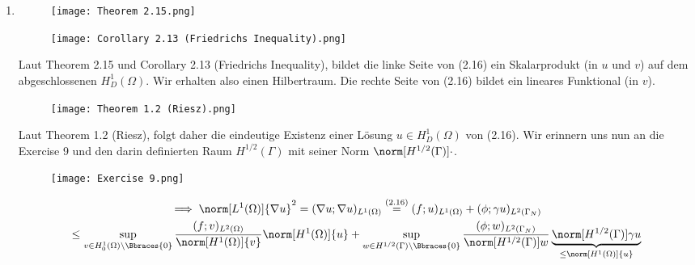 \begin{solution}
\begin{enumerate}[label = (\roman*)]
    \item

    \begin{figure}[h!]
        \centering
        \texttt{[image: Theorem 2.15.png]}
    \end{figure}

    \begin{figure}[h!]
        \centering
        \texttt{[image: Corollary 2.13 (Friedrichs Inequality).png]}
    \end{figure}

    Laut Theorem 2.15 und Corollary 2.13 (Friedrichs Inequality), bildet die linke Seite von (2.16) ein Skalarprodukt (in $u$ und $v$) auf dem abgeschlossenen $H_D^1(\Omega)$.
    Wir erhalten also einen Hilbertraum.
    Die rechte Seite von (2.16) bildet ein lineares Funktional (in $v$).
    
    \begin{figure}[h!]
        \centering
        \texttt{[image: Theorem 1.2 (Riesz).png]}
    \end{figure}

    Laut Theorem 1.2 (Riesz), folgt daher die eindeutige Existenz einer Lösung $u \in H_D^1(\Omega)$ von (2.16).
    Wir erinnern uns nun an die Exercise 9 und den darin definierten Raum $H^{1/2}(\Gamma)$ mit seiner Norm $\norm[H^{1/2}(\Gamma)]{\cdot}$.

    \begin{figure}[h!]
        \centering
        \texttt{[image: Exercise 9.png]}
    \end{figure}

    \begin{multline*}
        \implies
        \norm[L^1(\Omega)]{\nabla u}^2
        =
        (\nabla u; \nabla u)_{L^1(\Omega)}
        \stackrel{\text{(2.16)}}{=}
        (f; u)_{L^1(\Omega)}
        +
        (\phi; \gamma u)_{L^2(\Gamma_N)} \\
        \leq
        \sup_{v \in H_0^1(\Omega) \setminus \Bbraces{0}}
        \frac
        {
            (f; v)_{L^2(\Omega)}
        }{
            \norm[H^1(\Omega)]{v}
        }
        \norm[H^1(\Omega)]{u}
        +
        \sup_{w \in H^{1/2}(\Gamma) \setminus \Bbraces{0}}
        \frac
        {
            (\phi; w)_{L^2(\Gamma_N)}
        }{
            \norm[H^{1/2}(\Gamma)]{w}
        }
        \underbrace
        {
            \norm[H^{1/2}(\Gamma)]{\gamma u}
        }_{
            \leq
            \norm[H^1(\Omega)]{u}
        }
    \end{multline*}


\end{enumerate}
\end{solution}
